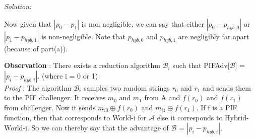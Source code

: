 \documentclass[a4paper, 11pt]{article}
\newenvironment{solution}
    {\textit{Solution:}}
    {\clearpage}
\newcommand{\calA}{\mathcal{A}}
\newcommand{\calB}{\mathcal{B}}
\begin{document}
\begin{solution}
\begin{enumerate}[(a)]
        Now given that $|p_0 - p_1|$ is non negligible, we can say that either $|p_0 - p_{hyb,0}|$ or $|p_1 - p_{hyb,1}|$ is non-negligible. Note that $p_{hyb,0}$ and $ p_{hyb,1}$ are negligibly far apart (because of part(a)).

        \textbf{Observation} : There exists a reduction algorithm $\calB_i$ such that PIFAdv[$\calB$] = $|p_i - p_{hyb,i}|$. (where i = 0 or 1) \\
        \textit{Proof} : The algorithm $\calB_i$ samples two random strings $r_0$ and $r_1$ and sends them to the PIF challenger. It receives $m_0$ and $m_1$ from A and $f(r_0)$ and $f(r_1)$ from challenger. Now it sends $m_{i0} \oplus f(r_0)$ and $m_{i1} \oplus f(r_1)$. If f is a PIF function, then that corresponds to World-i for $\calA$ else it corresponds to Hybrid-World-i. So we can thereby say that the advantage of $\calB$ = $|p_i - p_{hyb,i}|$.
        
    \end{enumerate}
\end{solution}
\end{document}
